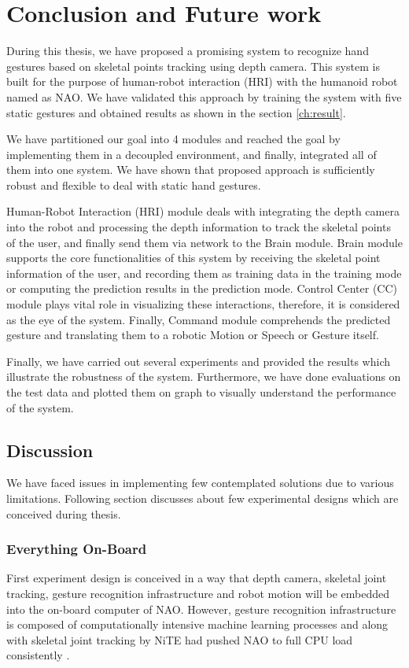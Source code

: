 \chapter{Conclusion and Future work} During this thesis, we have proposed a promising system to recognize hand gestures based on skeletal points tracking using depth camera. This system is built for the purpose of human-robot interaction (HRI) with the humanoid robot named as NAO. We have validated this approach by training the system with five static gestures and obtained results as shown in the section \ref{ch:result}.

We have partitioned our goal into 4 modules and reached the goal by implementing them in a decoupled environment, and finally, integrated all of them into one system. We have shown that proposed approach is sufficiently robust and flexible to deal with static hand gestures. 

Human-Robot Interaction (HRI) module deals with integrating the depth camera into the robot and processing the depth information to track the skeletal points of the user, and finally send them via network to the Brain module. Brain module supports the core functionalities of this system by receiving the skeletal point information of the user, and recording them as training data in the training mode or computing the prediction results in the prediction mode. Control Center (CC) module plays vital role in visualizing these interactions, therefore, it is considered as the eye of the system. Finally, Command module comprehends the predicted gesture and translating them to a robotic Motion or Speech or Gesture itself.

Finally, we have carried out several experiments and provided the results which illustrate the robustness of the system. Furthermore, we have done evaluations on the test data and plotted them on graph to visually understand the performance of the system. 

\section{Discussion} 
We have faced issues in implementing few contemplated solutions due to various limitations. Following section discusses about few experimental designs which are conceived during thesis.

\subsection{Everything On-Board} First experiment design is conceived in a way that depth camera, skeletal joint tracking, gesture recognition infrastructure and robot motion will be embedded into the on-board computer of NAO. However, gesture recognition infrastructure is composed of computationally intensive machine learning processes and along with skeletal joint tracking by NiTE had pushed NAO to full CPU load consistently \cite{17}.

